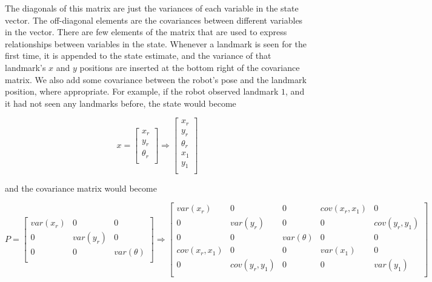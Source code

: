 \documentclass[prodmode,acmtecs]{acmsmall} %
\begin{document}
The diagonals of this matrix are just the variances of each variable in the state vector. The off-diagonal elements are the covariances between different variables in the vector. There are few elements of the matrix that are used to express relationships between variables in the state. Whenever a landmark is seen for the first time, it is appended to the state estimate, and the variance of that landmark's $x$ and $y$ positions are inserted at the bottom right of the covariance matrix. We also add some covariance between the robot's pose and the landmark position, where appropriate. For example, if the robot observed landmark $1$, and it had not seen any landmarks before, the state would become

$$
x
=
\begin{bmatrix}
    x_r \\
    y_r \\
    \theta_r \\
\end{bmatrix}
\Rightarrow
\begin{bmatrix}
    x_r \\
    y_r \\
    \theta_r \\
    x_1 \\
    y_1 \\
\end{bmatrix}
$$

and the covariance matrix would become

$$
P
=
\begin{bmatrix}
    var(x_r)     & 0            & 0               \\
    0            & var(y_r)     & 0               \\
    0            & 0            & var(\theta)     \\
\end{bmatrix}
\Rightarrow
\begin{bmatrix}
    var(x_r)     & 0            & 0               & cov(x_r,x_1) & 0            \\
    0            & var(y_r)     & 0               & 0            & cov(y_r,y_1) \\
    0            & 0            & var(\theta)     & 0            & 0            \\
    cov(x_r,x_1) & 0            & 0               & var(x_1)     & 0            \\
    0            & cov(y_r,y_1) & 0               & 0            & var(y_1)     \\
\end{bmatrix}
$$
\end{document}
